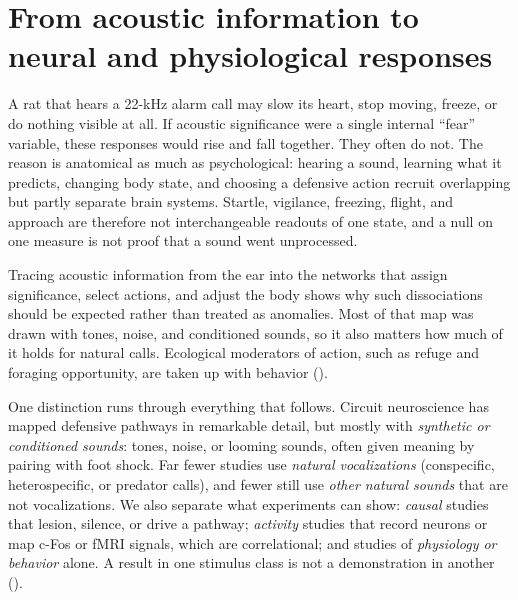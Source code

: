 \section{From acoustic information to neural and physiological responses}
\label{sec:mechanisms}

A rat that hears a 22-kHz alarm call may slow its heart, stop moving, freeze, or do nothing visible at all. If acoustic significance were a single internal ``fear'' variable, these responses would rise and fall together. They often do not. The reason is anatomical as much as psychological: hearing a sound, learning what it predicts, changing body state, and choosing a defensive action recruit overlapping but partly separate brain systems. Startle, vigilance, freezing, flight, and approach are therefore not interchangeable readouts of one state, and a null on one measure is not proof that a sound went unprocessed.

Tracing acoustic information from the ear into the networks that assign significance, select actions, and adjust the body shows why such dissociations should be expected rather than treated as anomalies. Most of that map was drawn with tones, noise, and conditioned sounds, so it also matters how much of it holds for natural calls. Ecological moderators of action, such as refuge and foraging opportunity, are taken up with behavior ().

One distinction runs through everything that follows. Circuit neuroscience has mapped defensive pathways in remarkable detail, but mostly with \emph{synthetic or conditioned sounds}: tones, noise, or looming sounds, often given meaning by pairing with foot shock. Far fewer studies use \emph{natural vocalizations} (conspecific, heterospecific, or predator calls), and fewer still use \emph{other natural sounds} that are not vocalizations. We also separate what experiments can show: \emph{causal} studies that lesion, silence, or drive a pathway; \emph{activity} studies that record neurons or map c-Fos or fMRI signals, which are correlational; and studies of \emph{physiology or behavior} alone. A result in one stimulus class is not a demonstration in another ().

